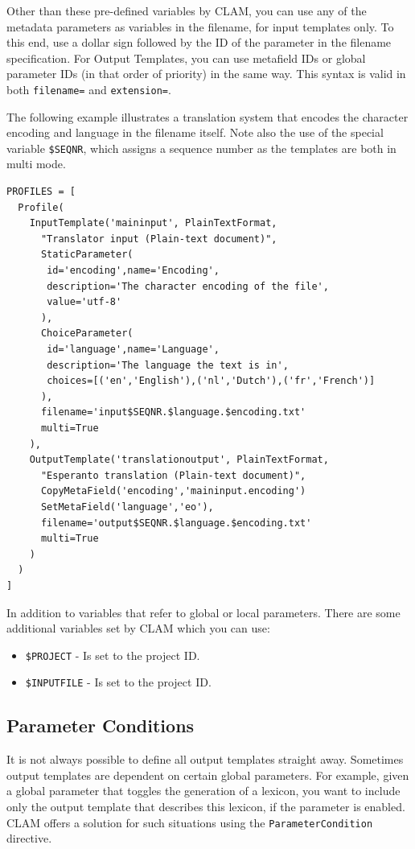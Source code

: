 \documentclass[a4paper,12pt,twoside,openright]{report}
\begin{document}
Other than these pre-defined variables by CLAM, you can use
any of the metadata parameters as variables in the filename, for input
templates only. To this end, use a
dollar sign followed by the ID of the parameter in the filename specification.
For Output Templates, you can use metafield IDs or global parameter IDs (in
that order of priority) in the same way. This syntax is valid in both
\texttt{filename=} and \texttt{extension=}.

The following example illustrates a translation system that encodes the
character encoding and language in the filename itself. Note also the use of
the special variable \texttt{\$SEQNR}, which assigns a sequence number as the
templates are both in multi mode.

{\small
\begin{verbatim}
PROFILES = [ 
  Profile( 
    InputTemplate('maininput', PlainTextFormat,
      "Translator input (Plain-text document)",  
      StaticParameter(
       id='encoding',name='Encoding',
       description='The character encoding of the file', 
       value='utf-8'
      ),  
      ChoiceParameter(
       id='language',name='Language',
       description='The language the text is in', 
       choices=[('en','English'),('nl','Dutch'),('fr','French')]
      ),
      filename='input$SEQNR.$language.$encoding.txt'
      multi=True
    ), 
    OutputTemplate('translationoutput', PlainTextFormat,
      "Esperanto translation (Plain-text document)",  
      CopyMetaField('encoding','maininput.encoding')
      SetMetaField('language','eo'),
      filename='output$SEQNR.$language.$encoding.txt'
      multi=True
    )    
  )
]
\end{verbatim}
}

In addition to variables that refer to global or local parameters. There are some additional variables set by CLAM which you can use:

\begin{itemize}
\item \texttt{\$PROJECT} - Is set to the project ID.
\item \texttt{\$INPUTFILE} - Is set to the project ID.
\end{itemize}



\subsection{Parameter Conditions}

It is not always possible to define all output templates straight away.
Sometimes output templates are dependent on certain global parameters. For
example, given a global parameter that toggles the generation of a lexicon, you
want to include only the output template that describes this lexicon, if the
parameter is enabled. CLAM offers a solution for such situations using the
\texttt{ParameterCondition} directive.
\end{document}
